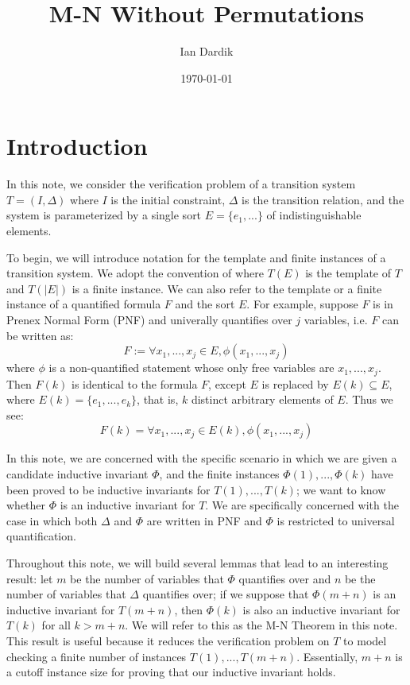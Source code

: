 \documentclass[12pt]{article}
\title{M-N Without Permutations}
\author{Ian Dardik}
\date{\today}
\theoremstyle{definition}
\theoremstyle{remark}
\begin{document}
\maketitle

\section{Introduction}
In this note, we consider the verification problem of a transition system $T=(I,\Delta)$ where $I$ is the initial constraint, $\Delta$ is the transition relation, and the system is parameterized by a single sort $E=\{e_1,...\}$ of indistinguishable elements.  

To begin, we will introduce notation for the template and finite instances of a transition system.  We adopt the convention of \cite{goel2021symmetry} where $T(E)$ is the template of $T$ and $T(|E|)$ is a finite instance.  We can also refer to the template or a finite instance of a quantified formula $F$ and the sort $E$.  For example, suppose $F$ is in Prenex Normal Form (PNF) and univerally quantifies over $j$ variables, i.e. $F$ can be written as:
$$F := \forall x_1,...,x_j \in E, \phi(x_1,...,x_j)$$
where $\phi$ is a non-quantified statement whose only free variables are $x_1,...,x_j$.  Then $F(k)$ is identical to the formula $F$, except $E$ is replaced by $E(k) \subseteq E$, where $E(k)=\{e_1,...,e_k\}$, that is, $k$ distinct arbitrary elements of $E$.  Thus we see:
$$F(k) = \forall x_1,...,x_j \in E(k), \phi(x_1,...,x_j)$$

In this note, we are concerned with the specific scenario in which we are given a candidate inductive invariant $\Phi$, and the finite instances $\Phi(1),...,\Phi(k)$ have been proved to be inductive invariants for $T(1),...,T(k)$; we want to know whether $\Phi$ is an inductive invariant for $T$.  We are specifically concerned with the case in which both $\Delta$ and $\Phi$ are written in PNF and $\Phi$ is restricted to universal quantification.

Throughout this note, we will build several lemmas that lead to an interesting result: let $m$ be the number of variables that $\Phi$ quantifies over and $n$ be the number of variables that $\Delta$ quantifies over; if we suppose that $\Phi(m+n)$ is an inductive invariant for $T(m+n)$, then $\Phi(k)$ is also an inductive invariant for $T(k)$ for all $k>m+n$.  We will refer to this as the M-N Theorem in this note.  This result is useful because it reduces the verification problem on $T$ to model checking a finite number of instances $T(1),...,T(m+n)$.  Essentially, $m+n$ is a cutoff instance size for proving that our inductive invariant holds.
\end{document}
